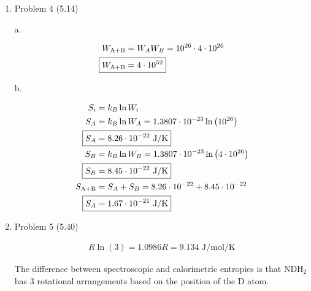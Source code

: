 \documentclass[12pt]{article}
\begin{document}
\begin{enumerate}
    b.

    \begin{align*}
        x &= \left(\frac{0.5128}{4\frac{1}{1}+0.5128}\right)^{1/2} \\
        \Aboxed{x &= 0.3371}
    \end{align*}

    c.

    \begin{align*}
        x &= \left(\frac{0.5128}{4\frac{0.01}{1}+0.5128}\right)^{1/2} \\
        \Aboxed{x &= 0.9631}
    \end{align*}
    
    \newpage
    \item Problem 4 (5.14)
    
    a.

    \begin{align*}
        W_{\text{A+B}} &= W_A W_B = 10^{26} \cdot 4 \cdot 10^{26} \\
        \Aboxed{W_{\text{A+B}} &= 4\cdot10^{52}}
    \end{align*}
    
    b.

    \begin{align*}
        S_i &= k_B \ln W_i \\
        S_A &= k_B \ln W_A = 1.3807\cdot10^{-23} \ln\left(10^{26}\right) \\ 
        \Aboxed{S_A &= 8.26\cdot10^{-22} \text{ J/K}} \\
        S_B &= k_B \ln W_B = 1.3807\cdot10^{-23} \ln\left(4\cdot10^{26}\right) \\ 
        \Aboxed{S_B &= 8.45\cdot10^{-22} \text{ J/K}} \\
        S_\text{A+B} &= S_A + S_B = 8.26\cdot10^{-22} + 8.45\cdot10^{-22} \\
        \Aboxed{S_A &= 1.67\cdot10^{-21} \text{ J/K}} \\
    \end{align*}
    
    \newpage
    \item Problem 5 (5.40)
    
    \begin{align*}
        R\ln\left(3\right) = 1.0986 R = 9.134 \text{ J/mol/K}
    \end{align*}

    The difference between spectroscopic and calorimetric entropies is that NDH$_2$ has 3 rotational arrangements based on the position of the D atom.

\end{enumerate}
\end{document}

